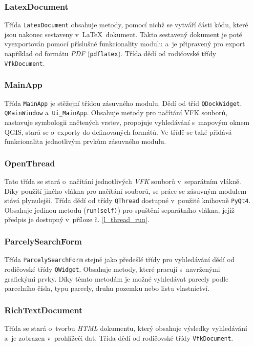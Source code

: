 \documentclass[a4paper,12pt,oneside]{book}
\newcommand{\latex}{\LaTeX}
\begin{document}
\subsubsection{LatexDocument}
Třída \texttt{LatexDocument} obsahuje metody, pomocí nichž se vytváří části kódu, které jsou nakonec sestaveny v~\latex~dokument. Takto sestavený dokument je poté vyexportován pomocí příslušné funkcionality modulu a~je připravený pro export například od formátu \textit{PDF} (\texttt{pdflatex}). Třída dědí od rodičovské třídy \texttt{VfkDocument}. 

\subsubsection{MainApp}
Třída \texttt{MainApp} je stěžejní třídou zásuvného modulu. Dědí od tříd \texttt{QDockWidget}, \texttt{QMainWindow} a~\texttt{Ui\_MainApp}. Obsahuje metody pro načítání VFK souborů, nastavuje symbologii načtených vrstev, propojuje vyhledávání s~mapovým oknem QGIS, stará se o~exporty do definovaných formátů. Ve třídě se také přidává funkcionalita jednotlivým prvkům zásuvného modulu.

\subsubsection{OpenThread}
Tato třída se stará o~načítání jednotlivých \textit{VFK} souborů v~separátním vlákně. Díky použití jiného vlákna pro načítání souborů, se práce se zásuvným modulem stává plynulejší. Třída dědí od třídy \texttt{QThread} dostupné v~použité knihovně \texttt{PyQt4}. Obsahuje jedinou metodu (\texttt{run(self)}) pro spuštění separátního vlákna, jejíž předpis je dostupný v~příloze č. \ref{l_thread_run}.

\subsubsection{ParcelySearchForm}
Třída \texttt{ParcelySearchForm} stejně jako předešlé třídy pro vyhledávání dědí od rodičovské třídy \texttt{QWidget}. Obsahuje metody, které pracují s~navrženými grafickými prvky. Díky těmto metodám je možné vyhledávat parcely podle parcelního čísla, typu parcely, druhu pozemku nebo listu vlastnictví.

\subsubsection{RichTextDocument}
Třída se stará o~tvorbu \textit{HTML} dokumentu, který obsahuje výsledky vyhledávání a~je zobrazen v~prohlížeči dat. Třída dědí od rodičovské třídy \texttt{VfkDocument}. 
\end{document}

